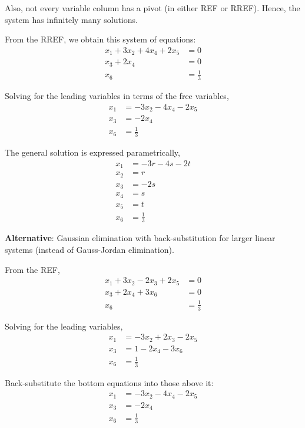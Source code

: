\documentclass[../linear-algebra.tex]{subfiles}
\begin{document}
\noindent Also, not every variable column has a pivot (in either REF or RREF).
Hence, the system has infinitely many solutions.

\noindent From the RREF, we obtain this system of equations:
\begin{align*}
    x_1 + 3x_2 + 4x_4 + 2x_5 &= 0 \\
    x_3 + 2x_4 &= 0 \\
    x_6 &= \frac{1}{3}
\end{align*}

\noindent Solving for the leading variables in terms of the free variables,
\begin{align*}
    x_1 &= -3x_2 - 4x_4 - 2x_5 \\
    x_3 &= -2x_4 \\
    x_6 &= \frac{1}{3}
\end{align*}

\noindent The general solution is expressed parametrically,
\begin{align*}
    x_1 &= -3r - 4s - 2t \\
    x_2 &= r \\
    x_3 &= -2s \\
    x_4 &= s \\
    x_5 &= t \\
    x_6 &= \frac{1}{3}
\end{align*}

\noindent\textbf{Alternative}: Gaussian elimination with back-substitution for larger linear systems
(instead of Gauss-Jordan elimination).

\noindent From the REF,
\begin{align*}
    x_1 + 3x_2 - 2x_3 + 2x_5 &= 0 \\
    x_3 + 2x_4 + 3x_6 &= 0 \\
    x_6 &= \frac{1}{3}
\end{align*}

\noindent Solving for the leading variables,
\begin{align*}
    x_1 &= -3x_2 + 2x_3 - 2x_5 \\
    x_3 &= 1 - 2x_4 - 3x_6 \\
    x_6 &= \frac{1}{3}
\end{align*}

\noindent Back-substitute the bottom equations into those above it:
\begin{align*}
    x_1 &= -3x_2 - 4x_4 - 2x_5 \\
    x_3 &= -2x_4 \\
    x_6 &= \frac{1}{3}
\end{align*}
\end{document}
